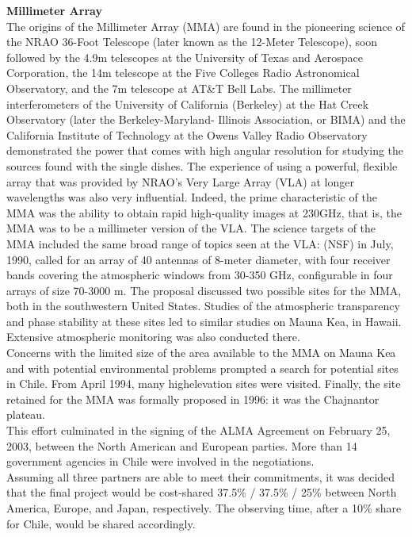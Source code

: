 \textbf{Millimeter Array} \\

The origins of the Millimeter Array (MMA) are found in the pioneering science of the NRAO 36-Foot Telescope (later known as the 12-Meter Telescope), soon followed by the 4.9m telescopes at the University of Texas and Aerospace Corporation, the 14m telescope at the Five Colleges Radio Astronomical Observatory, and the 7m telescope at AT\&T Bell Labs. The millimeter interferometers of the University of California (Berkeley) at the Hat Creek Observatory (later the Berkeley-Maryland- Illinois Association, or BIMA) and the California Institute of Technology at the Owens Valley Radio Observatory demonstrated the power that comes with high angular resolution for studying the sources found with the single dishes. The experience of using a powerful, flexible array that was provided by NRAO’s Very Large Array (VLA) at longer wavelengths was also very influential. Indeed, the prime characteristic of the MMA was the ability to obtain rapid high-quality images at 230GHz, that is, the MMA was to be a millimeter version of the VLA. The science targets of the MMA included the same broad range of topics seen at the VLA: (NSF) in July, 1990, called for an array of 40 antennas of 8-meter diameter, with four receiver bands covering the atmospheric windows from 30-350 GHz, configurable in four arrays of size 70-3000 m. The proposal discussed two possible sites for the MMA, both in the southwestern United States. Studies of the atmospheric transparency and phase stability at these sites led to similar studies on Mauna Kea, in Hawaii. Extensive atmospheric monitoring was also conducted there.\\


Concerns with the limited size of the area available to the MMA on Mauna Kea and with potential environmental problems prompted a search for potential sites in Chile. From April 1994, many highelevation sites were visited. Finally, the site retained for the MMA was formally proposed in 1996: it was the Chajnantor plateau. \\

This effort culminated in the signing of the ALMA Agreement on February 25, 2003, between the North American and European parties.
More than 14 government agencies in Chile were involved in the negotiations.\\

Assuming all three partners are able to meet their commitments, it was decided that the final project would be cost-shared 37.5\% / 37.5\% / 25\% between North America, Europe, and Japan, respectively. The observing time, after a 10\% share for Chile, would be shared accordingly.\\

